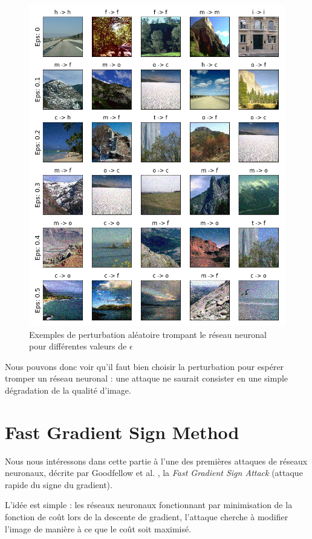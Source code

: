 \documentclass[10pt,twocolumn,letterpaper]{article}
\begin{document}
\begin{figure}[!ht]
\begin{center}
\includegraphics[width=0.9\linewidth]{ressources/aleatoire_img.png}
\end{center}
   \caption{Exemples de perturbation aléatoire trompant le réseau neuronal pour différentes valeurs de $\epsilon$}
\label{fig:aleatoire_img}
\end{figure}

Nous pouvons donc voir qu'il faut bien choisir la perturbation pour espérer tromper un réseau neuronal : une attaque ne saurait consister en une simple dégradation de la qualité d'image.

\section{Fast Gradient Sign Method}

Nous nous intéressons dans cette partie à l'une des premières attaques de réseaux neuronaux, décrite par Goodfellow et al.  \cite{goodfellow2014explaining}, la \textit{Fast Gradient Sign Attack} (attaque rapide du signe du gradient).

L'idée est simple : les réseaux neuronaux fonctionnant par minimisation de la fonction de coût lors de la descente de gradient, l'attaque cherche à modifier l'image de manière à ce que le coût soit maximisé.
\end{document}

